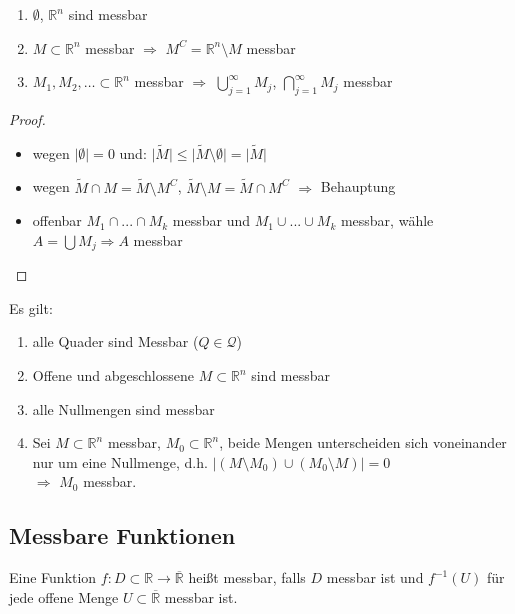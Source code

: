\begin{proposition}
	\begin{enumerate}[label={(\alph*)}]
		\item $\emptyset$, $\mathbb{R}^n$ sind messbar
		\item $M\subset\mathbb{R}^n$ messbar $\Rightarrow$ $M^C = \mathbb{R}^n\setminus M$ messbar 
		\item $M_1, M_2, \dotsc\subset\mathbb{R}^n$ messbar $\Rightarrow$ $\bigcup_{j=1}^\infty M_j$, $\bigcap_{j=1}^\infty M_j$ messbar
	\end{enumerate}
\end{proposition}
\begin{proof}\hspace*{0pt}
	\begin{itemize}[topsep=\dimexpr-\baselineskip / 2\relax]
		\item wegen $\vert\emptyset\vert = 0$ und: $\vert \tilde{M}\vert \le \vert\tilde{M}\setminus\emptyset\vert = \vert\tilde{M}\vert$
		\item wegen $\tilde{M}\cap M = \tilde{M}\setminus M^C$, $\tilde{M}\setminus M = \tilde{M}\cap M^C$ $\Rightarrow$ Behauptung
		\item offenbar $M_1\cap...\cap M_k$ messbar und $M_1\cup...\cup M_k$ messbar, wähle $A=\bigcup M_j\Rightarrow A$ messbar
	\end{itemize}
\end{proof}

\begin{proposition}
	Es gilt: \begin{enumerate}[label={(\alph*)}]
		\item alle Quader sind Messbar ($Q\in\mathcal{Q}$)
		\item Offene und abgeschlossene $M\subset\mathbb{R}^n$ sind messbar
		\item alle Nullmengen sind messbar
		\item Sei $M\subset\mathbb{R}^n$ messbar, $M_0\subset\mathbb{R}^n$, beide Mengen unterscheiden sich voneinander nur um eine Nullmenge, d.h. $\vert (M\setminus M_0)\cup (M_0\setminus M)\vert = 0$ \\
		$\Rightarrow$ $M_0$ messbar.
	\end{enumerate}
\end{proposition}

\subsection{Messbare Funktionen}
\begin{*definition}[messbar]
	Eine Funktion $f:D\subset\mathbb{R}\to\overline{\mathbb{R}}$ heißt messbar, falls $D$ messbar ist und $f^{-1}(U)$ für jede offene Menge $U\subset\overline{\mathbb{R}}$ messbar ist.
\end{*definition}

